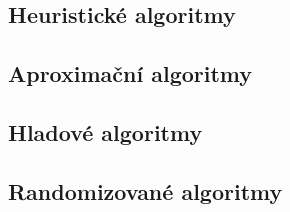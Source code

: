 \subsection{Heuristické algoritmy}

\subsection{Aproximační algoritmy}

\subsection{Hladové algoritmy}

\subsection{Randomizované algoritmy}














